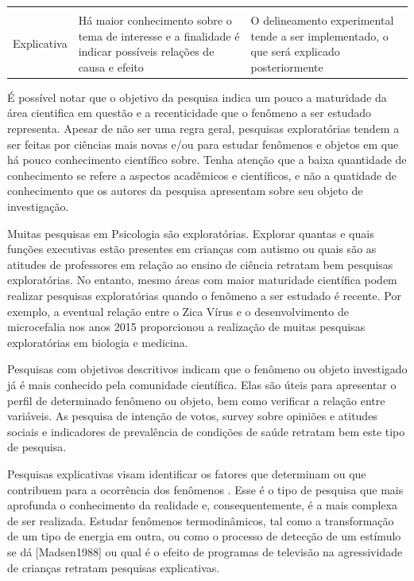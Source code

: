 \documentclass[
]{book}
\begin{document}
\begin{longtable}[]{@{}lll@{}}
\begin{minipage}[t]{0.30\columnwidth}
\end{minipage}\tabularnewline
\begin{minipage}[t]{0.30\columnwidth}\raggedright
Explicativa\strut
\end{minipage} & \begin{minipage}[t]{0.30\columnwidth}\raggedright
Há maior conhecimento sobre o tema de interesse e a finalidade é indicar possíveis relações de causa e efeito\strut
\end{minipage} & \begin{minipage}[t]{0.30\columnwidth}\raggedright
O delineamento experimental tende a ser implementado, o que será explicado posteriormente\strut
\end{minipage}\tabularnewline
\bottomrule
\end{longtable}

É possível notar que o objetivo da pesquisa indica um pouco a maturidade da área cientifica em questão e a recenticidade que o fenômeno a ser estudado representa. Apesar de não ser uma regra geral, pesquisas exploratórias tendem a ser feitas por ciências mais novas e/ou para estudar fenômenos e objetos em que há pouco conhecimento científico sobre. Tenha atenção que a baixa quantidade de conhecimento se refere a aspectos acadêmicos e científicos, e não a quatidade de conhecimento que os autores da pesquisa apresentam sobre seu objeto de investigação.

Muitas pesquisas em Psicologia são exploratórias. Explorar quantas e quais funções executivas estão presentes em crianças com autismo \citep{Skogli2020} ou quais são as atitudes de professores em relação ao ensino de ciência \citep{Jones1994} retratam bem pesquisas exploratórias. No entanto, mesmo áreas com maior maturidade científica podem realizar pesquisas exploratórias quando o fenômeno a ser estudado é recente. Por exemplo, a eventual relação entre o Zica Vírus e o desenvolvimento de microcefalia nos anos 2015 proporcionou a realização de muitas pesquisas exploratórias em biologia e medicina.

Pesquisas com objetivos descritivos indicam que o fenômeno ou objeto investigado já é mais conhecido pela comunidade científica. Elas são úteis para apresentar o perfil de determinado fenômeno ou objeto, bem como verificar a relação entre variáveis. As pesquisa de intenção de votos, survey sobre opiniões e atitudes sociais e indicadores de prevalência de condições de saúde retratam bem este tipo de pesquisa.

Pesquisas explicativas visam identificar os fatores que determinam ou que contribuem para a ocorrência dos fenômenos \citep{gil2002}. Esse é o tipo de pesquisa que mais aprofunda o conhecimento da realidade e, consequentemente, é a mais complexa de ser realizada. Estudar fenômenos termodinâmicos, tal como a transformação de um tipo de energia em outra, ou como o processo de detecção de um estímulo se dá {[}Madsen1988{]} ou qual é o efeito de programas de televisão na agressividade de crianças \citeyearpar{Bandura1961} retratam pesquisas explicativas.
\end{document}
